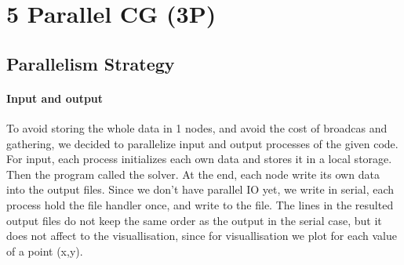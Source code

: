 \documentclass[article]{scrartcl}
\begin{document}
\section{5 Parallel CG (3P)}
\subsection{Parallelism Strategy}
\paragraph{Input and output} To avoid storing the whole data in 1 nodes, and avoid the cost of broadcas and gathering, we decided to parallelize input and output processes of the given code. For input, each process initializes each own data and stores it in a local storage. Then the program called the solver. At the end, each node write its own data into the output files. Since we don't have parallel IO yet, we write in serial, each process hold the file handler once, and write to the file. The lines in the resulted output files do not keep the same order as the output in the serial case, but it does not affect to the visuallisation, since for visuallisation we plot for each value of a point (x,y).
\end{document}
